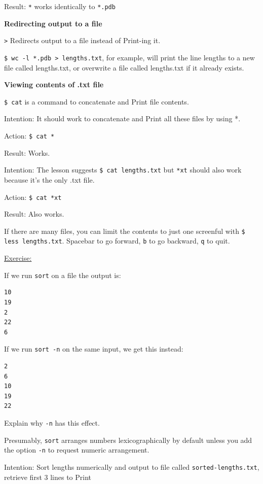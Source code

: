 \documentclass[12pt]{article}
\begin{document}
Result: \texttt{*} works identically to \texttt{*.pdb}

\vspace{1em}
\textbf{Redirecting output to a file}

\texttt{>} Redirects output to a file instead of Print-ing it. 

\texttt{\$ wc -l *.pdb > lengths.txt}, for example, will print the line lengths to a new file called lengths.txt, or overwrite a file called lengths.txt if it already exists.

\newpage\textbf{Viewing contents of .txt file}

\texttt{\$ cat} is a command to concatenate and Print file contents.

Intention: It should work to concatenate and Print all these files by using *.

Action: \texttt{\$ cat *}

Result: Works.

Intention: The lesson suggests \texttt{\$ cat lengths.txt} but \texttt{*xt} should also work because it's the only .txt file.

Action: \texttt{\$ cat *xt}

Result: Also works. 

If there are many files, you can limit the contents to just one screenful with \texttt{\$ less lengths.txt}. Spacebar to go forward, \texttt{b} to go backward, \texttt{q} to quit.

\begin{addmargin}[1cm]{0cm}
\color{gray}
\vspace{1em}\underline{Exercise:}

If we run \texttt{sort} on a file the output is:
\begin{verbatim}
10
19
2
22
6
\end{verbatim}
If we run \texttt{sort -n} on the same input, we get this instead:
\begin{verbatim}
2
6
10
19
22
\end{verbatim}
Explain why \texttt{-n} has this effect.

\vspace{1em}
\color{black}
Presumably, \texttt{sort} arranges numbers lexicographically by default unless you add the option \texttt{-n} to request numeric arrangement.
\end{addmargin}

Intention: Sort lengths numerically and output to file called \texttt{sorted-lengths.txt}, retrieve first 3 lines to Print
\end{document}
